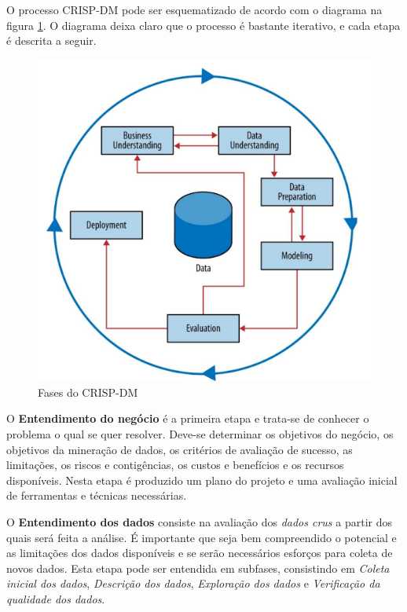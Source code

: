 \documentclass[
	article,			%
	11pt,				%
	oneside,			%
	a4paper,			%
	english,			%
	brazil,				%
	sumario=tradicional
	]{abntex2}
\begin{document}
O processo CRISP-DM pode ser esquematizado de acordo com o diagrama na figura
\ref{fig:crispdm}. O diagrama deixa claro que o processo é bastante iterativo, e
cada etapa é descrita a seguir.

\begin{figure}
  \includegraphics[width=\textwidth]{crisp-dm}
  \caption{Fases do CRISP-DM}
  \label{fig:crispdm}
\end{figure}

O \textbf{Entendimento do negócio} é a primeira etapa e trata-se de conhecer o
problema o qual se quer resolver. Deve-se determinar os objetivos do negócio,
os objetivos da mineração de dados, os critérios de avaliação de sucesso, as
limitações, os riscos e contigências, os custos e benefícios e os recursos
disponíveis. Nesta etapa é produzido um plano do projeto e uma avaliação inicial
de ferramentas e técnicas necessárias.

O \textbf{Entendimento dos dados} consiste na avaliação dos \textit{dados crus}
a partir dos quais será feita a análise. É importante que seja bem compreendido
o potencial e as limitações dos dados disponíveis e se serão necessários
esforços para coleta de novos dados. Esta etapa pode ser entendida em subfases,
consistindo em \textit{Coleta inicial dos dados}, \textit{Descrição dos dados},
\textit{Exploração dos dados} e \textit{Verificação da qualidade dos dados}.
\end{document}
